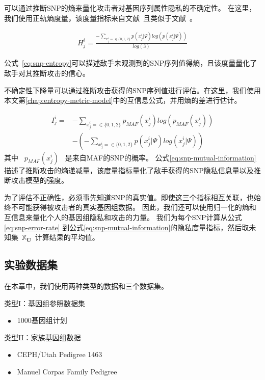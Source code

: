 可以通过推断SNP的熵来量化攻击者对基因序列属性隐私的不确定性。 在这里，我们使用正轨熵度量，该度量指标来自文献~\cite{humbert2013addressing}且类似于文献~\cite{deznabi2018inference}。

\begin{equation}
\begin{aligned}\label{eq:snp-entropy}
H^i_j=
\frac{-\sum_{x^i_j=\in \{0,1,2\}}{p(x^i_j|\Psi)log(p(x^i_j|\Psi))}}{log(3)}
\end{aligned}
\end{equation}

公式~\ref{eq:snp-entropy}可以描述敌手未观测到的SNP序列值得熵，且该度量量化了敌手对其推断攻击的信心。

不确定性下降量可以通过推断攻击获得的SNP序列值进行评估。在这里，我们使用本文第\ref{chap:entropy-metric-model}中的互信息公式，并用熵的差进行估计。

\begin{equation}\label{eq:snp-mutual-information}
\begin{aligned}
I^i_j=& -\sum_{x^i_j=\in \{0,1,2\}}p_{MAF}(x^i_j)log(p_{MAF}(x^i_j))  \nonumber \\
& - (-\sum_{x^i_j=\in \{0,1,2\}}{p(x^i_j|\Psi)log(x^i_j|\Psi)})
\end{aligned}
\end{equation}
其中 ~$p_{MAF}(x^i_j)$~ 是来自MAF的SNP的概率。 公式\ref{eq:snp-mutual-information}描述了推断攻击的熵递减量，该度量指标量化了敌手获得的SNP隐私信息量以及推断攻击模型的强度。

为了评估不正确性，必须事先知道SNP的真实值。即使这三个指标相互关联，也始终不可能获得被攻击者的真实基因组数据。 因此，我们还可以使用归一化的熵和互信息来量化个人的基因组隐私和攻击的力量。
我们为每个SNP计算从公式\ref{eq:snp-error-rate} 到公式\ref{eq:snp-mutual-information}的隐私度量指标，然后取未知集~$\mathbb{X}_{\mathbf{U}}$~计算结果的平均值。


\subsection{实验数据集}

在本章中，我们使用两种类型的数据和三个数据集。

类型I：基因组参照数据集

~$\bullet$~ 1000基因组计划


类型II：家族基因组数据


~$\bullet$~ CEPH/Utah Pedigree 1463 

~$\bullet$~ Manuel Corpas Family Pedigree 

